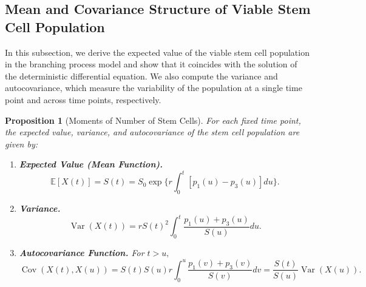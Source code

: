 \documentclass[pdflatex,sn-mathphys-num]{sn-jnl}
\theoremstyle{thmstyleone}%
\newtheorem{proposition}[theorem]{Proposition}%
\theoremstyle{thmstyletwo}%
\theoremstyle{thmstylethree}%
\begin{document}
\subsection{Mean and Covariance Structure of Viable Stem Cell Population}
In this subsection, we derive the expected value of the viable stem cell population in the branching process model and show that it coincides with the solution of the deterministic differential equation. We also compute the variance and autocovariance, which measure the variability of the population at a single time point and across time points, respectively.
\begin{proposition}[Moments of Number of Stem Cells] \label{prop:moments}
For each fixed time point, the expected value, variance, and autocovariance of the stem cell population are given by:

\begin{enumerate}
    \item \textbf{Expected Value (Mean Function).}
    \[
     \mathbb{E}[X(t)] = S(t) = S_0 \exp \Big\{r \int_0^t [ p_1(u) - p_3(u)] du\Big\}.
    \]

    \item \textbf{Variance.}
    \[
        \operatorname{Var}(X(t))
        = r S(t)^2 \int_0^t \frac{p_1(u) + p_3(u)}{S(u)}du.
    \]

    \item \textbf{Autocovariance Function.}
    For $t>u,$
    \[
       \operatorname{Cov}(X(t), X(u)) = S(t)S(u) r\int_0^u\frac{p_1(v) + p_3(v)}{S(v)}dv = \frac{S(t)}{S(u)} \operatorname{Var}(X(u)).
    \]
\end{enumerate}
\end{proposition}
\end{document}
